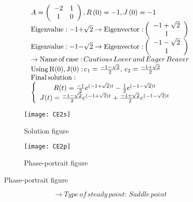 \documentclass[a4paper]{article}
\begin{document}
\[\begin{array}{l}
A = \left( {\begin{array}{*{20}{c}}
{ - 2}&1\\
1&0
\end{array}} \right),R\left( 0 \right) =  - 1,J\left( 0 \right) =  - 1\\
{\rm{Eigenvalue: - 1 + }}\sqrt 2  \to {\rm{Eigenvector:}}\left( {\begin{array}{*{20}{c}}
{ - 1 + \sqrt 2 }\\
1
\end{array}} \right)\\
{\rm{Eigenvalue: - 1 - }}\sqrt 2  \to {\rm{Eigenvector:}}\left( {\begin{array}{*{20}{c}}
{ - 1 - \sqrt 2 }\\
1
\end{array}} \right)\\
 \to {\rm{Name}}\,{\rm{of}}\,{\rm{case:}}\,Cautious\,Lover\,and\,Eager\,Beaver\\
{\rm{Using}}\,{\rm{R(0),}}\,{\rm{J(0):}}\,{{\rm{c}}_1} = \frac{{ - 1 - \sqrt 2 }}{2},\,{{\rm{c}}_2} = \frac{{ - 1 + \sqrt 2 }}{2}\\
{\rm{Final}}\,{\rm{solution:}}\\
\left\{ {\begin{array}{*{20}{c}}
{R(t) = \frac{{ - 1}}{2}{e^{({\rm{ - 1 + }}\sqrt 2 )t}} - \frac{1}{2}{e^{({\rm{ - 1 - }}\sqrt 2 )t}}}\\
{J(t) = \frac{{ - 1 - \sqrt 2 }}{2}{e^{({\rm{ - 1 + }}\sqrt 2 )t}} + \frac{{ - 1 + \sqrt 2 }}{2}{e^{({\rm{ - 1 - }}\sqrt 2 )t}}}
\end{array}} \right.
\end{array}\]
\begin{figure}[H]
\centering
\begin{subfigure}{.5\textwidth}
  \centering
  \texttt{[image: CE2s]}
  \caption*{Solution figure}
\end{subfigure}%
\begin{subfigure}{.5\textwidth}
  \centering
  \texttt{[image: CE2p]}
  \caption*{Phase-portrait figure}
\end{subfigure}
\end{figure}
\[  \to  Type\,of\,steady\,point:\,Saddle\,point\]
\end{document}
